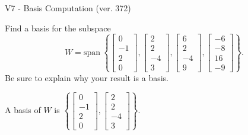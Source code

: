 \begin{exercise}
  \begin{exerciseTitle}V7 - Basis Computation (ver. 372)\end{exerciseTitle}
  \begin{exerciseStatement}
    Find a basis for the subspace 
\[W=\mathrm{span}\ \left\{\left[\begin{array}{r}
0 \\
-1 \\
2 \\
0
\end{array}\right] , \left[\begin{array}{r}
2 \\
2 \\
-4 \\
3
\end{array}\right] , \left[\begin{array}{r}
6 \\
2 \\
-4 \\
9
\end{array}\right] , \left[\begin{array}{r}
-6 \\
-8 \\
16 \\
-9
\end{array}\right]\right\}.\]
 Be sure to explain why your result is a basis.


  \end{exerciseStatement}
  \begin{exerciseAnswer}
   A basis of \(W\) is  \(\left\{\left[\begin{array}{r}
0 \\
-1 \\
2 \\
0
\end{array}\right] , \left[\begin{array}{r}
2 \\
2 \\
-4 \\
3
\end{array}\right]\right\}\).
  


  \end{exerciseAnswer}
\end{exercise}